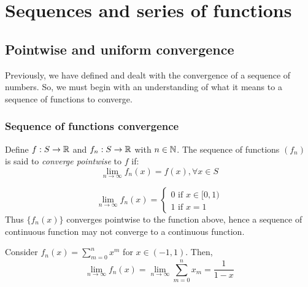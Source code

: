 \chapter{Sequences and series of functions}

\section{Pointwise and uniform convergence}

Previously, we have defined and dealt with the convergence of a sequence of numbers. So, we must begin with an understanding of what it means to a sequence of functions to converge.

\subsection{Sequence of functions convergence}

\begin{definition}
    Define $f:S \to \mathbb{R}$ and $f_n: S \to \mathbb{R}$ with $n \in \mathbb{N}$. The sequence of functions $(f_n)$ is said to \emph{converge pointwise} to $f$ if:
    \begin{equation*}
        \lim \limits_{n \to \infty} f_n(x) = f(x), \forall x \in S
    \end{equation*}
\end{definition}

\begin{eg}
    \begin{equation*}
        \lim \limits_{n \to \infty} f_n(x) = \begin{cases}
            0 \text{ if } x \in [0,1) \\
            1 \text{ if } x=1
        \end{cases}
    \end{equation*}
    Thus $\{f_n(x)\}$ converges pointwise to the function above, hence a sequence of continuous function may not converge to a continuous function.       
\end{eg}

\begin{eg}
    Consider $f_n(x) = \sum_{m=0}^n x^m$ for $x \in (-1,1)$. Then,
            \begin{equation*}
                \lim \limits_{n \to \infty} f_n(x) = \lim \limits_{n \to \infty} \sum \limits_{m=0}^n x_m = \frac{1}{1-x}
            \end{equation*}
\end{eg}

